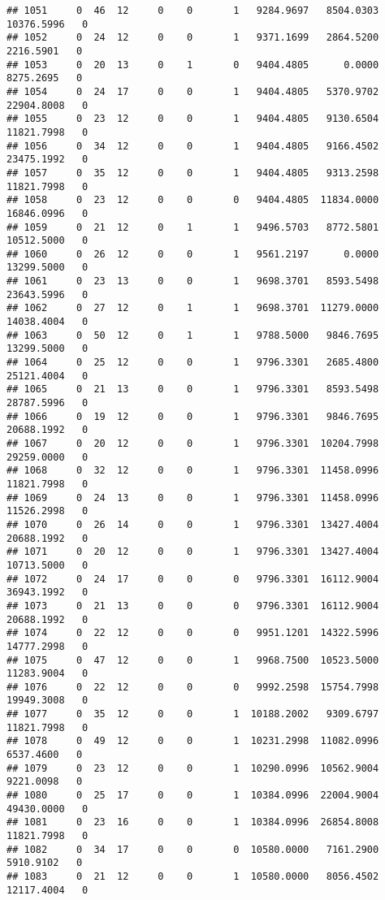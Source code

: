 \documentclass[
]{article}
\begin{document}
\begin{enumerate}
\begin{verbatim}
## 1051     0  46  12     0    0       1   9284.9697   8504.0303  10376.5996   0
## 1052     0  24  12     0    0       1   9371.1699   2864.5200   2216.5901   0
## 1053     0  20  13     0    1       0   9404.4805      0.0000   8275.2695   0
## 1054     0  24  17     0    0       1   9404.4805   5370.9702  22904.8008   0
## 1055     0  23  12     0    0       1   9404.4805   9130.6504  11821.7998   0
## 1056     0  34  12     0    0       1   9404.4805   9166.4502  23475.1992   0
## 1057     0  35  12     0    0       1   9404.4805   9313.2598  11821.7998   0
## 1058     0  23  12     0    0       0   9404.4805  11834.0000  16846.0996   0
## 1059     0  21  12     0    1       1   9496.5703   8772.5801  10512.5000   0
## 1060     0  26  12     0    0       1   9561.2197      0.0000  13299.5000   0
## 1061     0  23  13     0    0       1   9698.3701   8593.5498  23643.5996   0
## 1062     0  27  12     0    1       1   9698.3701  11279.0000  14038.4004   0
## 1063     0  50  12     0    1       1   9788.5000   9846.7695  13299.5000   0
## 1064     0  25  12     0    0       1   9796.3301   2685.4800  25121.4004   0
## 1065     0  21  13     0    0       1   9796.3301   8593.5498  28787.5996   0
## 1066     0  19  12     0    0       1   9796.3301   9846.7695  20688.1992   0
## 1067     0  20  12     0    0       1   9796.3301  10204.7998  29259.0000   0
## 1068     0  32  12     0    0       1   9796.3301  11458.0996  11821.7998   0
## 1069     0  24  13     0    0       1   9796.3301  11458.0996  11526.2998   0
## 1070     0  26  14     0    0       1   9796.3301  13427.4004  20688.1992   0
## 1071     0  20  12     0    0       1   9796.3301  13427.4004  10713.5000   0
## 1072     0  24  17     0    0       0   9796.3301  16112.9004  36943.1992   0
## 1073     0  21  13     0    0       0   9796.3301  16112.9004  20688.1992   0
## 1074     0  22  12     0    0       0   9951.1201  14322.5996  14777.2998   0
## 1075     0  47  12     0    0       1   9968.7500  10523.5000  11283.9004   0
## 1076     0  22  12     0    0       0   9992.2598  15754.7998  19949.3008   0
## 1077     0  35  12     0    0       1  10188.2002   9309.6797  11821.7998   0
## 1078     0  49  12     0    0       1  10231.2998  11082.0996   6537.4600   0
## 1079     0  23  12     0    0       1  10290.0996  10562.9004   9221.0098   0
## 1080     0  25  17     0    0       1  10384.0996  22004.9004  49430.0000   0
## 1081     0  23  16     0    0       1  10384.0996  26854.8008  11821.7998   0
## 1082     0  34  17     0    0       0  10580.0000   7161.2900   5910.9102   0
## 1083     0  21  12     0    0       1  10580.0000   8056.4502  12117.4004   0

\end{verbatim}
\end{enumerate}
\end{document}
